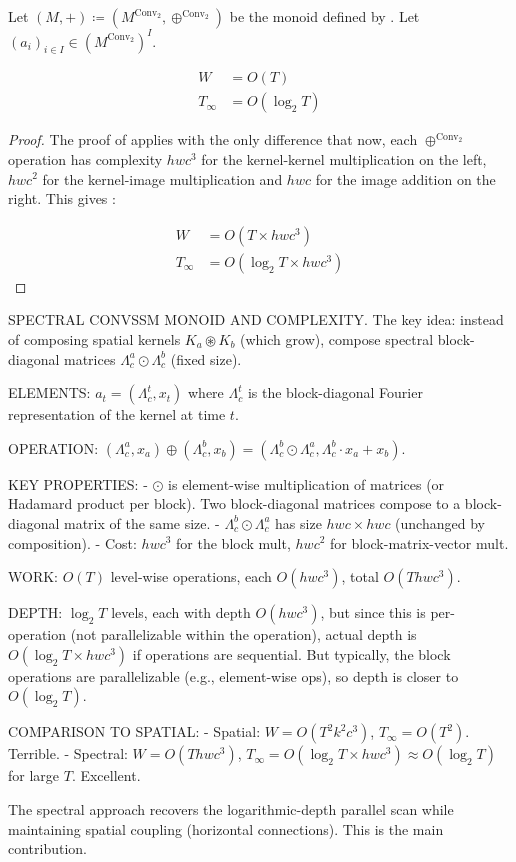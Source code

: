 \documentclass{article}
\begin{document}
\begin{proposition}
    Let $(M, +) \coloneqq (M^{\mathrm{Conv}_2}, \oplus^{\mathrm{Conv}_2})$ be the monoid defined by . Let $(a_i)_{i\in I}\in (M^{\mathrm{Conv}_2})^I$.

\begin{align}
    W&= O(T)\\
    T_\infty&= O(\log_2T)
\end{align}
\end{proposition}

\begin{proof}
The proof of  applies with the only difference that now, each $\oplus^{\mathrm{Conv}_2}$ operation has complexity $h w c^3$ for the kernel-kernel multiplication on the left, $h w c^2$ for the kernel-image multiplication and $h w c$ for the image addition on the right. This gives :

\begin{align}
\label{eq:W_spectral}
    W&= O(T \times h w c^3)\\
\label{eq:T_spectral}
    T_\infty&= O(\log_2T \times h w c^3)
\end{align}
\end{proof}

\begin{thomasbox}
SPECTRAL CONVSSM MONOID AND COMPLEXITY. The key idea: instead of composing spatial kernels $K_a \circledast K_b$ (which grow), compose spectral block-diagonal matrices $\Lambda^a_c \odot \Lambda^b_c$ (fixed size).

ELEMENTS: $a_t = (\Lambda^t_c, x_t)$ where $\Lambda^t_c$ is the block-diagonal Fourier representation of the kernel at time $t$.

OPERATION: $(\Lambda^a_c, x_a) \oplus (\Lambda^b_c, x_b) = (\Lambda^b_c \odot \Lambda^a_c, \Lambda^b_c \cdot x_a + x_b)$.

KEY PROPERTIES:
- $\odot$ is element-wise multiplication of matrices (or Hadamard product per block). Two block-diagonal matrices compose to a block-diagonal matrix of the same size.
- $\Lambda^b_c \odot \Lambda^a_c$ has size $hwc \times hwc$ (unchanged by composition).
- Cost: $hwc^3$ for the block mult, $hwc^2$ for block-matrix-vector mult.

WORK: $O(T)$ level-wise operations, each $O(hwc^3)$, total $O(T hwc^3)$.

DEPTH: $\log_2 T$ levels, each with depth $O(hwc^3)$, but since this is per-operation (not parallelizable within the operation), actual depth is $O(\log_2 T \times hwc^3)$ if operations are sequential. But typically, the block operations are parallelizable (e.g., element-wise ops), so depth is closer to $O(\log_2 T)$.

COMPARISON TO SPATIAL:
- Spatial: $W = O(T^2 k^2 c^3)$, $T_\infty = O(T^2)$. Terrible.
- Spectral: $W = O(T hwc^3)$, $T_\infty = O(\log_2 T \times hwc^3) \approx O(\log_2 T)$ for large $T$. Excellent.

The spectral approach recovers the logarithmic-depth parallel scan while maintaining spatial coupling (horizontal connections). This is the main contribution.
\end{thomasbox}
\end{document}

